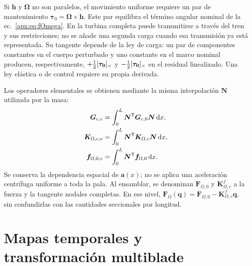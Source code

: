 Si $\bm h$ y $\bm\Omega$ no son paralelos, el movimiento uniforme requiere un par de mantenimiento $\bm\tau_0=\bm\Omega\times\bm h$. Este par equilibra el término angular nominal de la ec.~\eqref{apx:eq:fOmega}. En la turbina completa puede transmitirse a través del tren y sus restricciones; no se añade una segunda carga cuando esa transmisión ya está representada. Su tangente depende de la ley de carga: un par de componentes constantes en el cuerpo perturbado y uno constante en el marco nominal producen, respectivamente, $+\tfrac12[\bm{\tau_0}]_\times$ y $-\tfrac12[\bm{\tau_0}]_\times$ en el residual linealizado. Una ley elástica o de control requiere su propia derivada.

Los operadores elementales se obtienen mediante la misma interpolación $\bm N$ utilizada por la masa:
\begin{align}
\bm G_{c,e}&=\int_0^L\bm N^\mathsf T\bm G_{c,6}\bm N\,\mathrm d x,\nonumber\\
\bm K_{\Omega,c,e}&=\int_0^L\bm N^\mathsf T\bm K_{\Omega,c}\bm N\,\mathrm d x,\nonumber\\
\bm f_{\Omega,0,e}&=\int_0^L\bm N^\mathsf T\bm f_{\Omega,0}\,\mathrm d x.
\end{align}
Se conserva la dependencia espacial de $\bm a(x)$; no se aplica una aceleración centrífuga uniforme a toda la pala. Al ensamblar, se denominan $\bm F_{\Omega,0}$ y $\bm K_{\Omega,c}^{f}$ a la fuerza y la tangente nodales completas. En ese nivel, $\bm F_\Omega(\bm q)=\bm F_{\Omega,0}-\bm K_{\Omega,c}^{f}\bm q$, sin confundirlas con las cantidades seccionales por longitud.


\section{Mapas temporales y transformación multiblade}\label{ap:mapas}

